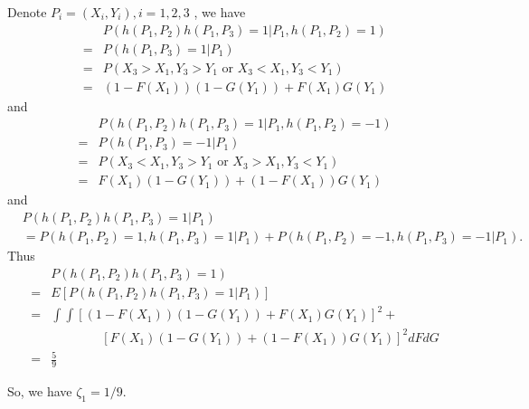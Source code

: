 \begin{solution}
    Denote $P_i = (X_i,Y_i), i=1,2,3$ , we have
    \begin{equation*}
        \begin{split}
            &  P(h(P_1, P_2) h(P_1, P_3)=1   |P_1, h(P_1, P_2)=1) \\
            = & P(h(P_1, P_3)=1|P_1) \\
            = & P(X_3>X_1, Y_3>Y_1 \text{ or } X_3<X_1, Y_3<Y_1) \\
            = & (1-F(X_1))(1-G(Y_1)) + F(X_1)G(Y_1)
        \end{split}
    \end{equation*}
    and
    \begin{equation*}
        \begin{split}
            &  P(h(P_1, P_2) h(P_1, P_3)=1   | P_1, h(P_1, P_2)=-1) \\
            = & P(h(P_1, P_3)=-1 | P_1) \\
            = & P(X_3<X_1, Y_3>Y_1 \text{ or } X_3>X_1, Y_3<Y_1) \\
            = & F(X_1)(1-G(Y_1)) + (1-F(X_1))G(Y_1)
        \end{split}
    \end{equation*}
    and
    \begin{equation*}
        \begin{split}
            & P(h(P_1, P_2) h(P_1, P_3)=1 |  P_1) \\
            &= P(h(P_1, P_2)=1, h(P_1, P_3)=1 |  P_1) + P(h(P_1, P_2)=-1, h(P_1, P_3)=-1 |  P_1) .
        \end{split}
    \end{equation*}
    Thus
    \begin{equation*}
        \begin{split}
            & P(h(P_1, P_2) h(P_1, P_3)=1) \\
            = & E[P(h(P_1, P_2) h(P_1, P_3)=1 |  P_1)]\\
            = & \int\int [(1-F(X_1))(1-G(Y_1)) + F(X_1)G(Y_1)]^2 + \\
            & \quad\quad\quad\quad [F(X_1)(1-G(Y_1)) + (1-F(X_1))G(Y_1)]^2 d F d G \\
            = & \frac{5}{9}
        \end{split}
    \end{equation*}

    So, we have $\zeta_1=1/9$.
\end{solution}



